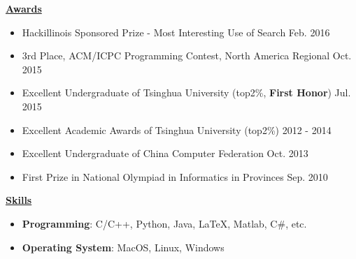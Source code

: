 \documentclass[11pt]{article}
\begin{document}
\begin{CJK}{GBK}{kai}
{ \textbf{\underline{Awards}}}\\
\begin{itemize}
\item Hackillinois Sponsored Prize - Most Interesting Use of Search \hfill Feb. 2016
\item 3rd Place, ACM/ICPC Programming Contest, North America Regional \hfill Oct. 2015
\item Excellent Undergraduate of Tsinghua University (top2\%, \textbf{First Honor}) \hfill Jul. 2015
\item Excellent Academic Awards of Tsinghua University (top2\%) \hfill 2012 - 2014
\item Excellent Undergraduate of China Computer Federation \hfill Oct. 2013
\item First Prize in National Olympiad in Informatics in Provinces \hfill Sep. 2010
\end{itemize}

\bigskip

{ \textbf{\underline{Skills}}}
\begin{itemize}
    \item \textbf{Programming}: C/C++, Python, Java, {\LaTeX},  Matlab, C\#, etc.%
    \item \textbf{Operating System}: MacOS, Linux, Windows
\end{itemize}

\end{CJK}
\end{document}
